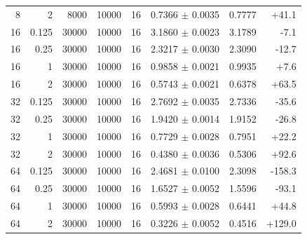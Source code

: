 {\begin{longtable}[]{@{}rrrrrrrr@{}}
8 & 2 & 8000 & 10000 & 16 & 0.7366 $\pm$ 0.0035 & 0.7777 & +41.1 \\
16 & 0.125 & 30000 & 10000 & 16 & 3.1860 $\pm$ 0.0023 & 3.1789 & -7.1 \\
16 & 0.25 & 30000 & 10000 & 16 & 2.3217 $\pm$ 0.0030 & 2.3090 & -12.7 \\
16 & 1 & 30000 & 10000 & 16 & 0.9858 $\pm$ 0.0021 & 0.9935 & +7.6 \\
16 & 2 & 30000 & 10000 & 16 & 0.5743 $\pm$ 0.0021 & 0.6378 & +63.5 \\
32 & 0.125 & 30000 & 10000 & 16 & 2.7692 $\pm$ 0.0035 & 2.7336 & -35.6 \\
32 & 0.25 & 30000 & 10000 & 16 & 1.9420 $\pm$ 0.0014 & 1.9152 & -26.8 \\
32 & 1 & 30000 & 10000 & 16 & 0.7729 $\pm$ 0.0028 & 0.7951 & +22.2 \\
32 & 2 & 30000 & 10000 & 16 & 0.4380 $\pm$ 0.0036 & 0.5306 & +92.6 \\
64 & 0.125 & 30000 & 10000 & 16 & 2.4681 $\pm$ 0.0100 & 2.3098 & -158.3 \\
64 & 0.25 & 30000 & 10000 & 16 & 1.6527 $\pm$ 0.0052 & 1.5596 & -93.1 \\
64 & 1 & 30000 & 10000 & 16 & 0.5993 $\pm$ 0.0028 & 0.6441 & +44.8 \\
64 & 2 & 30000 & 10000 & 16 & 0.3226 $\pm$ 0.0052 & 0.4516 & +129.0 \\
\end{longtable}
}


